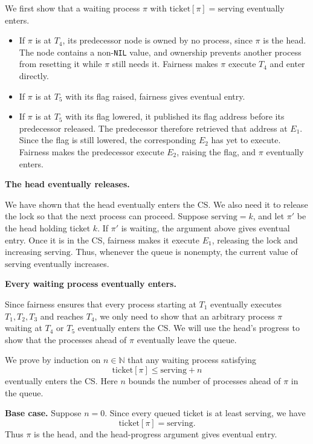 \documentclass[12pt]{amsproc}
\begin{document}
We first show that a waiting process $\pi$ with
$\mathrm{ticket}[\pi]=\mathrm{serving}$ eventually enters.

\begin{itemize}
    \item If $\pi$ is at $T_4$, its predecessor node is owned by no process, since $\pi$ is the head. The node contains a non-\texttt{NIL} value, and ownership prevents another process from resetting it while $\pi$ still needs it. Fairness makes $\pi$ execute $T_4$ and enter directly.

    \item If $\pi$ is at $T_5$ with its flag raised, fairness gives eventual entry.

    \item If $\pi$ is at $T_5$ with its flag lowered, it published its flag address before its predecessor released. The predecessor therefore retrieved that address at $E_1$. Since the flag is still lowered, the corresponding $E_2$ has yet to execute. Fairness makes the predecessor execute $E_2$, raising the flag, and $\pi$ eventually enters.
\end{itemize}

\textbf{The head eventually releases.}

We have shown that the head eventually enters the CS. We also need it to release the lock so that the next process can proceed. Suppose $\mathrm{serving}=k$, and let $\pi'$ be the head holding ticket $k$. If $\pi'$ is waiting, the argument above gives eventual entry. Once it is in the CS, fairness makes it execute $E_1$, releasing the lock and increasing $\mathrm{serving}$. Thus, whenever the queue is nonempty, the current value of $\mathrm{serving}$ eventually increases.

\textbf{Every waiting process eventually enters.}

Since fairness ensures that every process starting at $T_1$ eventually executes $T_1,T_2,T_3$ and reaches $T_4$, we only need to show that an arbitrary process $\pi$ waiting at $T_4$ or $T_5$ eventually enters the CS. We will use the head's progress to show that the processes ahead of $\pi$ eventually leave the queue.

We prove by induction on $n\in\mathbb{N}$ that any waiting process satisfying
\[
    \mathrm{ticket}[\pi]\le\mathrm{serving}+n
\]
eventually enters the CS. Here $n$ bounds the number of processes ahead of $\pi$ in the queue.

\textbf{Base case.}
Suppose $n=0$. Since every queued ticket is at least
$\mathrm{serving}$, we have
\[
    \mathrm{ticket}[\pi]=\mathrm{serving}.
\]
Thus $\pi$ is the head, and the head-progress argument gives eventual entry.
\end{document}
